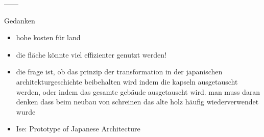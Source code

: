 \documentclass[a4paper, 12pt]{article}
\begin{document}
\begin{onehalfspace}
------


Gedanken


\begin{itemize}
  \item hohe kosten für land
  \item die fläche könnte viel effizienter genutzt werden!
  \item die frage ist, ob das prinzip der transformation in der japanischen architekturgeschichte beibehalten wird indem die kapseln ausgetauscht werden, oder indem das gesamte gebäude ausgetauscht wird. man muss daran denken dass beim neubau von schreinen das alte holz häufig wiederverwendet wurde
  \item Ise: Prototype of Japanese Architecture
\end{itemize}


\end{onehalfspace}
\nocite{*}
\printbibliography

%
\end{document}
